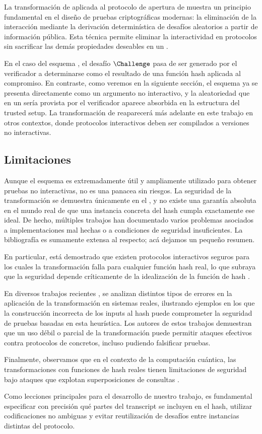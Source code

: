 La transformación de \FiatShamir aplicada al protocolo de apertura de \KZG muestra un principio fundamental en el diseño de pruebas criptográficas modernas: la eliminación de la interacción mediante la derivación determinística de desafíos aleatorios a partir de información pública. Esta técnica permite eliminar la interactividad en protocolos sin sacrificar las demás propiedades deseables en un \SNARK.

En el caso del esquema \KZG, el desafío $\Challenge$ pasa de ser generado por el verificador a determinarse como el resultado de una función hash aplicada al compromiso. En contraste, como veremos en la siguiente sección, el esquema \Groth ya se presenta directamente como un argumento no interactivo, y la aleatoriedad que en un \SigmaProtocol sería provista por el verificador aparece absorbida en la estructura del trusted setup. La transformación de \FiatShamir reaparecerá más adelante en este trabajo en otros contextos, donde protocolos interactivos deben ser compilados a versiones no interactivas.

\subsection{Limitaciones}

Aunque el esquema \FiatShamir es extremadamente útil y ampliamente utilizado para obtener pruebas no interactivas, no es una panacea sin riesgos. La seguridad de la transformación se demuestra únicamente en el \ROM, y no existe una garantía absoluta en el mundo real de que una instancia concreta del hash cumpla exactamente ese ideal. De hecho, múltiples trabajos han documentado varios problemas asociados a implementaciones mal hechas o a condiciones de seguridad insuficientes. La bibliografía es sumamente extensa al respecto; acá dejamos un pequeño resumen.

En particular, está demostrado que existen protocolos interactivos seguros para los cuales la transformación \FiatShamir falla para cualquier función hash real, lo que subraya que la seguridad depende críticamente de la idealización de la función de hash \cite{Goldwasser}.

En diversos trabajos recientes \cite{Dao2023, cryptoeprint:2024/1565, Khovratovich2025}, se analizan distintos tipos de errores en la aplicación de la transformación en sistemas reales, ilustrando ejemplos en los que la construcción incorrecta de los inputs al hash puede comprometer la seguridad de pruebas basadas en esta heurística. Los autores de estos trabajos demuestran que un uso débil o parcial de la transformación puede permitir ataques efectivos contra protocolos de \SNARK concretos, incluso pudiendo falsificar pruebas.

Finalmente, observamos que en el contexto de la computación cuántica, las transformaciones \FiatShamir con funciones de hash reales tienen limitaciones de seguridad bajo ataques que explotan superposiciones de consultas \cite{cryptoeprint:2024/590}.

Como lecciones principales para el desarrollo de nuestro trabajo, es fundamental especificar con precisión qué partes del transcript se incluyen en el hash, utilizar codificaciones no ambiguas y evitar reutilización de desafíos entre instancias distintas del protocolo.
